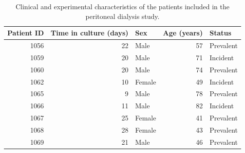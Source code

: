 \begin{table}[htbp]
    \centering
    \caption{Clinical and experimental characteristics of the patients included in the peritoneal dialysis study.}
    \label{tab:patient_characteristics}
\begin{tabular}{rrlrl}
\toprule
Patient ID & Time in culture (days) & Sex & Age (years) & Status \\
\midrule
1056 & 22 & Male & 57 & Prevalent \\
1059 & 20 & Male & 71 & Incident \\
1060 & 20 & Male & 74 & Prevalent \\
1062 & 10 & Female & 49 & Incident \\
1065 & 9 & Male & 78 & Prevalent \\
1066 & 11 & Male & 82 & Incident \\
1067 & 25 & Female & 41 & Prevalent \\
1068 & 28 & Female & 43 & Prevalent \\
1069 & 21 & Male & 46 & Prevalent \\
\bottomrule
\end{tabular}

\end{table}
